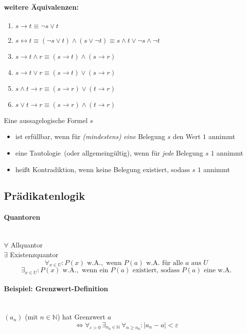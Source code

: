 \paragraph{weitere Äquivalenzen:}
\begin{enumerate}
\item $s \rightarrow t \equiv \neg s \lor t$
\item $s \leftrightarrow t \equiv (\neg s \lor t) \land (s \lor \neg t) \equiv s \land t \lor \neg s \land \neg t$
\item $s \rightarrow t \land r \equiv (s\rightarrow t) \land (s \rightarrow r)$
\item $s \rightarrow t \lor r \equiv (s\rightarrow t) \lor (s \rightarrow r)$
\item $s \land t \rightarrow r \equiv (s \rightarrow r) \lor (t \rightarrow r)$
\item $s \lor t \rightarrow r \equiv (s \rightarrow r) \land (t \rightarrow r)$
\end{enumerate}
%
\begin{defi}
Eine aussagelogische Formel $s$
\begin{itemize}
\item ist \glq erfüllbar\grq , wenn für \emph{(mindestens) eine} Belegung $s$ den Wert $1$ annimmt
\item eine \glq Tautologie\grq\ (oder \glq allgemeingültig\grq ), wenn für \emph{jede} Belegung $s$ $1$ annimmt
\item heißt \glq Kontradiktion\grq , wenn keine Belegung existiert, sodass $s$ $1$ annimmt
\end{itemize}
\end{defi}

\subsection{Prädikatenlogik}
\paragraph{Quantoren}
\ \\$ \forall $ Allquantor \\
$ \exists $ Existenzquantor \\

\[
\forall_{x\in U}:P(x) \text{ w.A.},\text{ wenn }P(a) \text{ w.A. f\"ur alle } a \text{ aus } U
\]
\[
\exists_{x\in U}:P(x) \text{ w.A.},\text{ wenn ein }P(a) \text{ existiert, sodass } P(a) \text{ eine w.A.}
\]

\paragraph{Beispiel: Grenzwert-Definition}
\ \\
$(a_n)$ (mit $n\in \mathbb{N}$) hat Grenzwert $a$
\[
\Leftrightarrow \forall_{\varepsilon > 0} \, \exists_{n_0 \in \mathbb{N}} \, \forall_{n \geq n_0}: |a_n - a| < \varepsilon
\]

